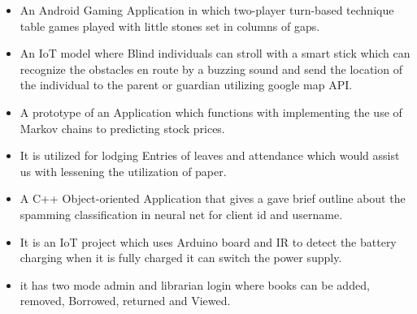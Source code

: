 \begin{itemize}
\item An Android Gaming Application in which two-player turn-based technique table games played with little stones set in columns of gaps.
\end{itemize}

\begin{itemize}
\item An IoT model where Blind individuals can stroll with a smart stick which can recognize the obstacles en route by a buzzing sound and send the location of the individual to the parent or guardian utilizing google map API. 
\end{itemize}

\begin{itemize}
\item A prototype of an Application which functions with implementing the use of Markov chains to predicting stock prices.
\end{itemize}

\begin{itemize}
\item It is utilized for lodging Entries of leaves and attendance which would assist us with lessening the utilization of paper.
\end{itemize}

\begin{itemize}
\item A C++ Object-oriented Application that gives a gave brief outline about the spamming classification in neural net for client id and username. 
\end{itemize}

\begin{itemize}
    \item It is an IoT project which uses Arduino board and IR to detect the battery charging when it is fully charged it can switch the power supply.
\end{itemize}

\begin{itemize}
    \item it has two mode admin and librarian login where books can be added, removed, Borrowed, returned and Viewed.
\end{itemize}
